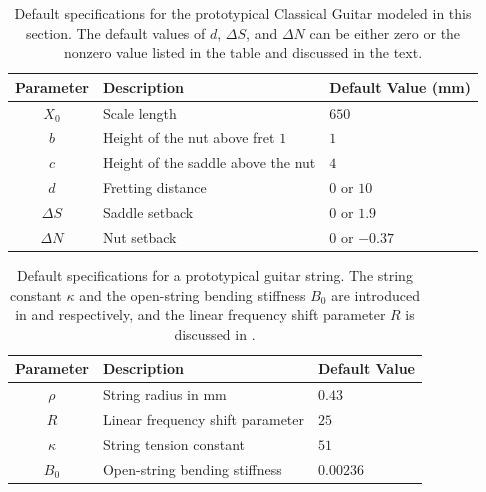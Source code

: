 \begin{table}%
  \centering
  \caption{\label{tbl:mcg_specs} Default specifications for the prototypical Classical Guitar modeled in this section. The default values of $d$, $\Delta S$, and $\Delta N$ can be either zero or the nonzero value listed in the table and discussed in the text.}
  \begin{tabular}{cll}
    \toprule
    Parameter & Description & Default Value (mm) \\
    \midrule
    $X_0$ & Scale length& $650$ \\
    $b$ & Height of the nut above fret $1$& $1$ \\
    $c$ & Height of the saddle above the nut & $4$ \\
    $d$ & Fretting distance & $0$ or $10$ \\
    $\Delta S$ & Saddle setback & $0$ or $1.9$ \\
    $\Delta N$ & Nut setback & $0$ or $-0.37$ \\
    \bottomrule
  \end{tabular}
\end{table}%

\begin{table}%
  \centering
  \caption{\label{tbl:string_specs} Default specifications for a prototypical guitar string. The string constant $\kappa$ and the open-string bending stiffness $B_0$ are introduced in  and  respectively, and the linear frequency shift parameter $R$ is discussed in .}
  \begin{tabular}{cll}
    \toprule
    Parameter & Description & Default Value \\
    \midrule
    $\rho$ & String radius in mm & $0.43$ \\
    $R$ & Linear frequency shift parameter & $25$ \\
    $\kappa$ & String tension constant & $51$ \\
    $B_0$ & Open-string bending stiffness & $0.00236$ \\
    \bottomrule
  \end{tabular}
\end{table}%

